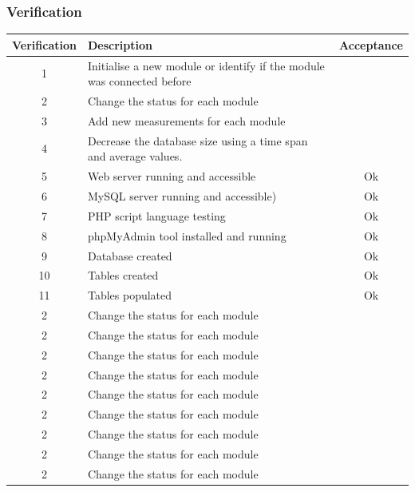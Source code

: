 %	
\subsubsection{Verification}
\begin{table}[H]
\centering
	\begin{tabular}{| c | l | c |}
		\hline
		Verification & Description & Acceptance \\\hline
		1 & Initialise a new module or identify if the module was connected before & ~ \\\hline
		2 & Change the status for each module & ~ \\\hline
		3 & Add new measurements for each module & ~ \\\hline
		4 & Decrease the database size using a time span and average values. & ~ \\\hline
		5 & Web server running and accessible & Ok \\\hline
		6 & MySQL server running and accessible) & Ok \\\hline
		7 & PHP script language testing & Ok \\\hline
		8 & phpMyAdmin tool installed and running & Ok \\\hline
		9 & Database created & Ok \\\hline
		10 & Tables created & Ok \\\hline
		11 & Tables populated & Ok \\\hline
		2 & Change the status for each module & ~ \\\hline
		2 & Change the status for each module & ~ \\\hline
		2 & Change the status for each module & ~ \\\hline
		2 & Change the status for each module & ~ \\\hline
		2 & Change the status for each module & ~ \\\hline
		2 & Change the status for each module & ~ \\\hline
		2 & Change the status for each module & ~ \\\hline
		2 & Change the status for each module & ~ \\\hline
		2 & Change the status for each module & ~ \\\hline
	\end{tabular}
\end{table}
